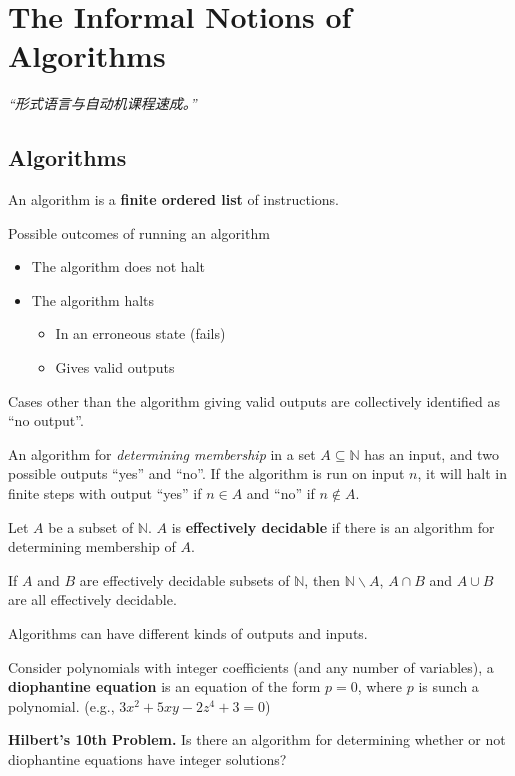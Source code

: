 \chapter{The Informal Notions of Algorithms}

\emph{“形式语言与自动机课程速成。”}

\section{Algorithms}

\begin{definition}
    \label{def:Algorithm}
    An algorithm is a \textbf{finite ordered list} of instructions.
\end{definition}

Possible outcomes of running an algorithm
\begin{itemize}
    \item The algorithm does not halt
    \item The algorithm halts
    \begin{itemize}
        \item In an erroneous state (fails)
        \item Gives valid outputs
    \end{itemize}
\end{itemize}
Cases other than the algorithm giving valid outputs are collectively identified as ``no output''.

\begin{definition}
    An algorithm for \emph{determining membership} in a set $A \subseteq \mathbb{N}$ has an input, and two possible outputs ``yes'' and ``no''. If the algorithm is run on input $n$, it will halt in finite steps with output ``yes'' if $n \in A$ and ``no'' if $n \notin A$.
\end{definition}

\begin{definition}
    \label{def:EffectivelyDecidableSet}
    Let $A$ be a subset of $\mathbb{N}$. $A$ is \textbf{effectively decidable} if there is an algorithm for determining membership of $A$.
\end{definition}
\begin{theorem}
    If $A$ and $B$ are effectively decidable subsets of $\mathbb{N}$, then $\mathbb{N}\backslash A$, $A \cap B$ and $A \cup B$ are all effectively decidable.
\end{theorem}

Algorithms can have different kinds of outputs and inputs.

\begin{definition}
    Consider polynomials with integer coefficients (and any number of variables), a \textbf{diophantine equation} is an equation of the form $p=0$, where $p$ is sunch a polynomial. (e.g., $3x^2 + 5xy - 2z^4 +3 = 0$)
\end{definition}

\textbf{Hilbert's 10th Problem.} Is there an algorithm for determining whether or not diophantine equations have integer solutions?
